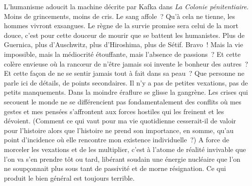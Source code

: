 \documentclass[french,twoside]{book} %
\begin{document}
L’humanisme adoucit la machine décrite par Kafka dans \emph{La Colonie pénitentiaire}. Moins de grincements, moins de cris. Le sang affole ? Qu’à cela ne tienne, les hommes vivront exsangues. Le règne de la survie promise sera celui de la mort douce, c’est pour cette douceur de mourir que se battent les humanistes. Plus de Guernica, plus d’Auschwitz, plus d’Hiroshima, plus de Sétif. Bravo ! Mais la vie impossible, mais la médiocrité étouffante, mais l’absence de passions ? Et cette colère envieuse où la rancœur de n’être jamais soi invente le bonheur des autres ? Et cette façon de ne se sentir jamais tout à fait dans sa peau ? Que personne ne parle ici de détails, de points secondaires. Il n’y a pas de petites vexations, pas de petits manquements. Dans la moindre éraflure se glisse la gangrène. Les crises qui secouent le monde ne se différencient pas fondamentalement des conflits où mes gestes et mes pensées s’affrontent aux forces hostiles qui les freinent et les dévoient. (Comment ce qui vaut pour ma vie quotidienne cesserait-il de valoir pour l’histoire alors que l’histoire ne prend son importance, en somme, qu’au point d’incidence où elle rencontre mon existence individuelle ?) A force de morceler les vexations et de les multiplier, c’est à l’atome de réalité invivable que l’on va s’en prendre tôt ou tard, libérant soudain une énergie nucléaire que l’on ne soupçonnait plus sous tant de passivité et de morne résignation. Ce qui produit le bien général est toujours terrible.
\end{document}
